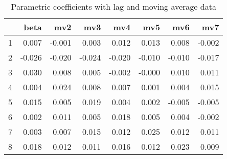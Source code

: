 \documentclass[a4paper, 12pt]{article}
\begin{document}
\begin{table}[h]
\centering
\caption{Parametric coefficients with lag and moving average data}
\begin{tabular}{rrrrrrrr}
  \hline
 & beta & mv2 & mv3 & mv4 & mv5 & mv6 & mv7 \\
  \hline
1 & 0.007 & -0.001 & 0.003 & 0.012 & 0.013 & 0.008 & -0.002 \\
  2 & -0.026 & -0.020 & -0.024 & -0.020 & -0.010 & -0.010 & -0.017 \\
  3 & 0.030 & 0.008 & 0.005 & -0.002 & -0.000 & 0.010 & 0.011 \\
  4 & 0.004 & 0.024 & 0.008 & 0.007 & 0.001 & 0.004 & 0.015 \\
  5 & 0.015 & 0.005 & 0.019 & 0.004 & 0.002 & -0.005 & -0.005 \\
  6 & 0.002 & 0.011 & 0.005 & 0.018 & 0.005 & 0.004 & -0.002 \\
  7 & 0.003 & 0.007 & 0.015 & 0.012 & 0.025 & 0.012 & 0.011 \\
  8 & 0.018 & 0.012 & 0.011 & 0.016 & 0.012 & 0.023 & 0.009 \\
   \hline
\end{tabular}
\end{table}
\clearpage
\end{document}
